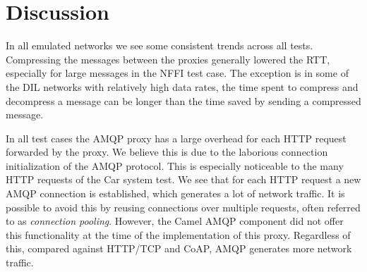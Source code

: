 \begin{landscape}
    \begin{figure}
    \centering
    \begin{floatrow}
    \end{floatrow}
    \end{figure}
\end{landscape}

\section{Discussion}
\label{section:evaluation-discussion}

In all emulated networks we see some consistent trends across all tests.
Compressing the messages between the proxies generally lowered the RTT,
especially for large messages in the NFFI test case. The exception is in some of
the DIL networks with relatively high data rates, the time spent to compress
and decompress a message can be longer than the time saved by sending a
compressed message.

In all test cases the AMQP proxy has a large overhead for each HTTP request forwarded
by the proxy. We believe this is due to the laborious connection initialization
of the AMQP protocol. This is especially noticeable to the many HTTP requests of
the Car system test. We see that for each HTTP request a new AMQP connection is
established, which generates a lot of network traffic. It is possible to avoid
this by reusing connections over multiple requests, often referred to as
\textit{connection pooling}. However, the Camel AMQP component did not offer
this functionality at the time of the implementation of this proxy. Regardless
of this, compared against HTTP/TCP and CoAP, AMQP generates more network
traffic.

